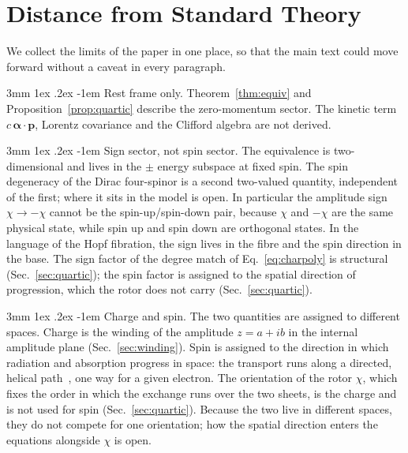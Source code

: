 \documentclass[%
 reprint, amsmath,amssymb, aps, prb, ]{revtex4-2}
\makeatletter
\numberwithin{equation}{section}
\renewcommand\paragraph{%
  \@startsection{paragraph}{4}{\z@}%
    {3mm \@plus 1ex \@minus .2ex}
    {-1em}
    {\normalfont\normalsize\itshape}}
\makeatother
\begin{document}
\section{Distance from Standard Theory}
\label{sec:limits}

We collect the limits of the paper in one place, so that the main text could move forward without a caveat in every paragraph.

\paragraph{Rest frame only.} Theorem~\ref{thm:equiv} and Proposition~\ref{prop:quartic} describe the zero-momentum sector. The kinetic term $c\,\bm{\alpha}\cdot\mathbf{p}$, Lorentz covariance and the Clifford algebra are not derived.

\paragraph{Sign sector, not spin sector.} The equivalence is two-dimensional and lives in the $\pm$ energy subspace at fixed spin. The spin degeneracy of the Dirac four-spinor is a second two-valued quantity, independent of the first; where it sits in the model is open. In particular the amplitude sign $\chi\to-\chi$ cannot be the spin-up/spin-down pair, because $\chi$ and $-\chi$ are the same physical state, while spin up and spin down are orthogonal states. In the language of the Hopf fibration, the sign lives in the fibre and the spin direction in the base. The sign factor of the degree match of Eq.~\eqref{eq:charpoly} is structural (Sec.~\ref{sec:quartic}); the spin factor is assigned to the spatial direction of progression, which the rotor does not carry (Sec.~\ref{sec:quartic}).

\paragraph{Charge and spin.} The two quantities are assigned to different spaces. Charge is the winding of the amplitude $z=a+ib$ in the internal amplitude plane (Sec.~\ref{sec:winding}). Spin is assigned to the direction in which radiation and absorption progress in space: the transport runs along a directed, helical path~\cite{ref:p51}, one way for a given electron. The orientation of the rotor $\chi$, which fixes the order in which the exchange runs over the two sheets, is the charge and is not used for spin (Sec.~\ref{sec:quartic}). Because the two live in different spaces, they do not compete for one orientation; how the spatial direction enters the equations alongside $\chi$ is open.
\end{document}
